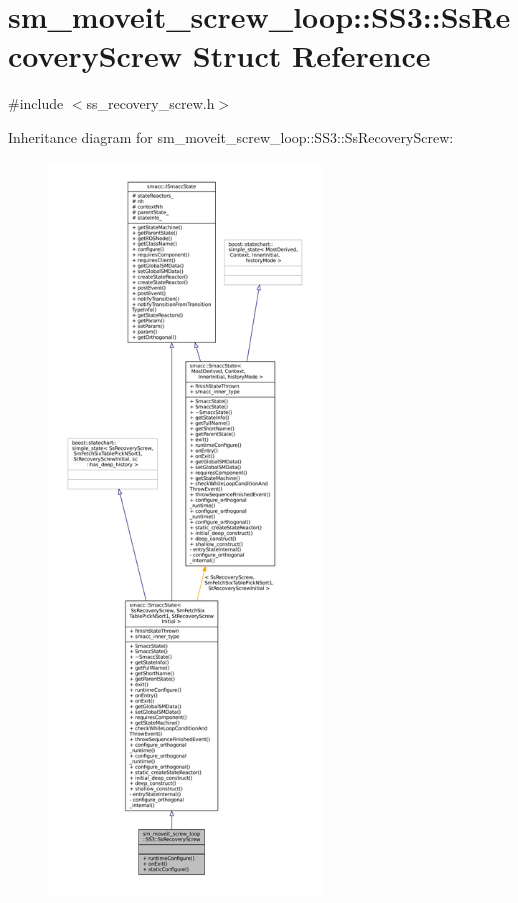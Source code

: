 \hypertarget{structsm__moveit__screw__loop_1_1SS3_1_1SsRecoveryScrew}{}\section{sm\+\_\+moveit\+\_\+screw\+\_\+loop\+:\+:S\+S3\+:\+:Ss\+Recovery\+Screw Struct Reference}
\label{structsm__moveit__screw__loop_1_1SS3_1_1SsRecoveryScrew}


{\ttfamily \#include $<$ss\+\_\+recovery\+\_\+screw.\+h$>$}



Inheritance diagram for sm\+\_\+moveit\+\_\+screw\+\_\+loop\+:\+:S\+S3\+:\+:Ss\+Recovery\+Screw\+:
\nopagebreak
\begin{figure}[H]
\begin{center}
\leavevmode
\includegraphics[height=550pt]{structsm__moveit__screw__loop_1_1SS3_1_1SsRecoveryScrew__inherit__graph}
\end{center}
\end{figure}


